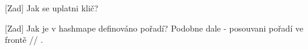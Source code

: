 
\begin{DoxyRefList}
\item[\label{bug__bug000001}%
\Hypertarget{bug__bug000001}%
page \hyperlink{index}{Úvod a zadání} ]\mbox{[}Zad\mbox{]} Jak se uplatni klič?

\mbox{[}Zad\mbox{]} Jak je v hashmape definováno pořadí? Podobne dale -\/ posouvani pořadí ve frontě // .
\end{DoxyRefList}
